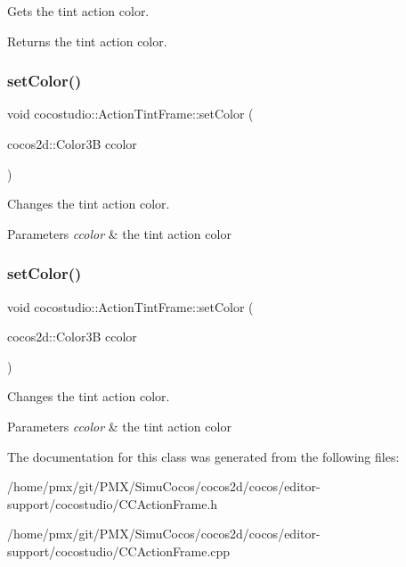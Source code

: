 Gets the tint action color.

\begin{DoxyReturn}{Returns}
the tint action color. 
\end{DoxyReturn}
\mbox{\label{classcocostudio_1_1ActionTintFrame_abfa2d7b7047c5c6c7ca02a6c31c5fad4}} 
\subsubsection{\texorpdfstring{set\+Color()}{setColor()}\hspace{0.1cm}{\footnotesize\ttfamily [1/2]}}
{\footnotesize\ttfamily void cocostudio\+::\+Action\+Tint\+Frame\+::set\+Color (\begin{DoxyParamCaption}\item[{cocos2d\+::\+Color3B}]{ccolor }\end{DoxyParamCaption})}

Changes the tint action color.


\begin{DoxyParams}{Parameters}
{\em ccolor} & the tint action color \\
\hline
\end{DoxyParams}
\mbox{\label{classcocostudio_1_1ActionTintFrame_abfa2d7b7047c5c6c7ca02a6c31c5fad4}} 
\subsubsection{\texorpdfstring{set\+Color()}{setColor()}\hspace{0.1cm}{\footnotesize\ttfamily [2/2]}}
{\footnotesize\ttfamily void cocostudio\+::\+Action\+Tint\+Frame\+::set\+Color (\begin{DoxyParamCaption}\item[{cocos2d\+::\+Color3B}]{ccolor }\end{DoxyParamCaption})}

Changes the tint action color.


\begin{DoxyParams}{Parameters}
{\em ccolor} & the tint action color \\
\hline
\end{DoxyParams}


The documentation for this class was generated from the following files\+:\begin{DoxyCompactItemize}
\item 
/home/pmx/git/\+P\+M\+X/\+Simu\+Cocos/cocos2d/cocos/editor-\/support/cocostudio/C\+C\+Action\+Frame.\+h\item 
/home/pmx/git/\+P\+M\+X/\+Simu\+Cocos/cocos2d/cocos/editor-\/support/cocostudio/C\+C\+Action\+Frame.\+cpp\end{DoxyCompactItemize}
